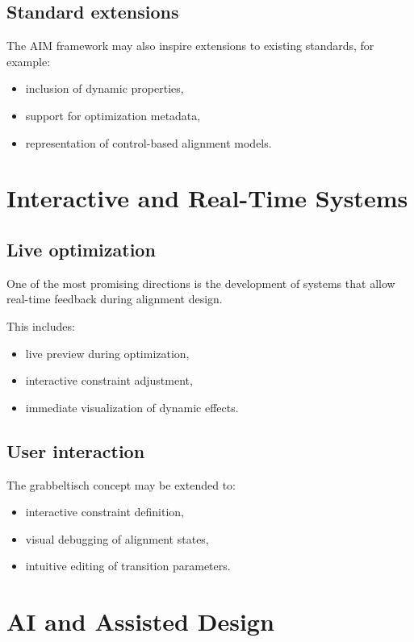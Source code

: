 \subsection{Standard extensions}

The AIM framework may also inspire extensions to existing standards,
for example:
\begin{itemize}
\item inclusion of dynamic properties,
\item support for optimization metadata,
\item representation of control-based alignment models.
\end{itemize}


\section{Interactive and Real-Time Systems}

\subsection{Live optimization}

One of the most promising directions is the development of systems that
allow real-time feedback during alignment design.

This includes:
\begin{itemize}
\item live preview during optimization,
\item interactive constraint adjustment,
\item immediate visualization of dynamic effects.
\end{itemize}

\subsection{User interaction}

The grabbeltisch concept may be extended to:
\begin{itemize}
\item interactive constraint definition,
\item visual debugging of alignment states,
\item intuitive editing of transition parameters.
\end{itemize}


\section{AI and Assisted Design}

